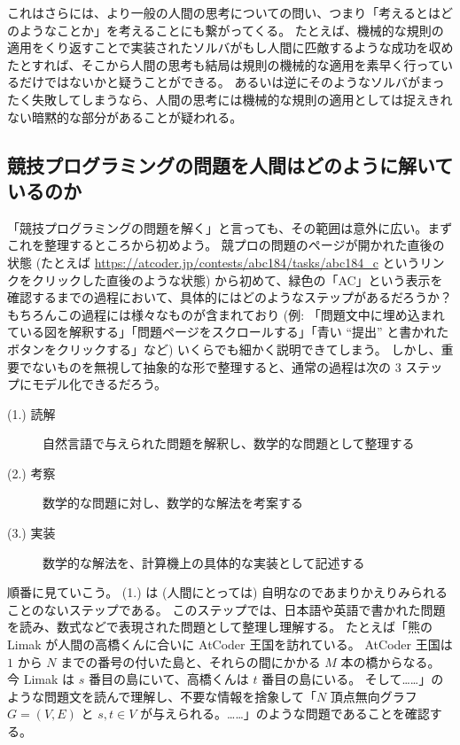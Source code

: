 \documentclass{ltjsarticle}
\begin{document}
これはさらには、より一般の人間の思考についての問い、つまり「考えるとはどのようなことか」を考えることにも繋がってくる。
たとえば、機械的な規則の適用をくり返すことで実装されたソルバがもし人間に匹敵するような成功を収めたとすれば、そこから人間の思考も結局は規則の機械的な適用を素早く行っているだけではないかと疑うことができる。
あるいは逆にそのようなソルバがまったく失敗してしまうなら、人間の思考には機械的な規則の適用としては捉えきれない暗黙的な部分があることが疑われる。


\subsection{競技プログラミングの問題を人間はどのように解いているのか}

「競技プログラミングの問題を解く」と言っても、その範囲は意外に広い。まずこれを整理するところから初めよう。
競プロの問題のページが開かれた直後の状態 (たとえば \url{https://atcoder.jp/contests/abc184/tasks/abc184_c} というリンクをクリックした直後のような状態) から初めて、緑色の「AC」という表示を確認するまでの過程において、具体的にはどのようなステップがあるだろうか？
もちろんこの過程には様々なものが含まれており (例: 「問題文中に埋め込まれている図を解釈する」「問題ページをスクロールする」「青い ``提出'' と書かれたボタンをクリックする」など) いくらでも細かく説明できてしまう。
しかし、重要でないものを無視して抽象的な形で整理すると、通常の過程は次の 3 ステップにモデル化できるだろう。

\begin{description}
    \item[(1.) 読解] 自然言語で与えられた問題を解釈し、数学的な問題として整理する
    \item[(2.) 考察] 数学的な問題に対し、数学的な解法を考案する
    \item[(3.) 実装] 数学的な解法を、計算機上の具体的な実装として記述する
\end{description}

順番に見ていこう。
(1.) は (人間にとっては) 自明なのであまりかえりみられることのないステップである。
このステップでは、日本語や英語で書かれた問題を読み、数式などで表現された問題として整理し理解する。
たとえば「熊の Limak が人間の高橋くんに合いに AtCoder 王国を訪れている。
AtCoder 王国は $1$ から $N$ までの番号の付いた島と、それらの間にかかる $M$ 本の橋からなる。
今 Limak は $s$ 番目の島にいて、高橋くんは $t$ 番目の島にいる。
そして……」のような問題文を読んで理解し、不要な情報を捨象して「$N$ 頂点無向グラフ $G = (V, E)$ と $s, t \in V$ が与えられる。……」のような問題であることを確認する。
\end{document}
